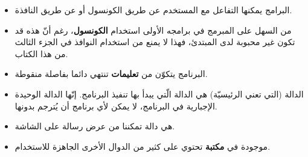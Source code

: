 \begin{itemize}
  \item البرامج يمكنها التفاعل مع المستخدم عن طريق الكونسول أو عن طريق النافذة.
  \item من السهل على المبرمج في برامجه الأولى استخدام
\textbf{الكونسول}،
رغم أنّ هذه قد تكون غير محبوبة لدى المبتدئ، فهذا لا يمنع من استخدام النوافذ في الجزء الثالث من هذا الكتاب.
  \item البرنامج يتكوّن من
\textbf{تعليمات}
 تنتهي دائما بفاصلة منقوطة.
  \item الدالة
 (التي تعني الرئيسيّة) هي الدالة الّتي يبدأ بها تنفيذ البرنامج. إنّها الدالة الوحيدة الإجبارية في البرنامج، لا يمكن لأي برنامج أن يُترجم بدونها.
 \item {}
 هي دالة تمكننا من عرض رسالة على الشاشة.
 \item {}
موجودة في
\textbf{مكتبة}
 تحتوي على كثير من الدوال الأخرى الجاهزة للاستخدام.
\end{itemize}
